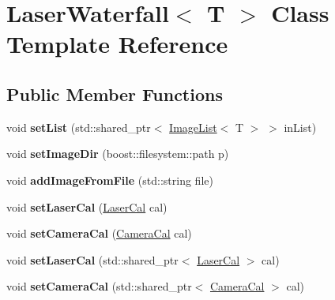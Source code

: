 \hypertarget{classLaserWaterfall}{}\section{Laser\+Waterfall$<$ T $>$ Class Template Reference}
\label{classLaserWaterfall}
\subsection*{Public Member Functions}
\begin{DoxyCompactItemize}
\item 
void {\bfseries set\+List} (std\+::shared\+\_\+ptr$<$ \hyperlink{classImageList}{Image\+List}$<$ T $>$ $>$ in\+List)\hypertarget{classLaserWaterfall_aa47637b350f6a84efc213d2fb3af69f3}{}\label{classLaserWaterfall_aa47637b350f6a84efc213d2fb3af69f3}

\item 
void {\bfseries set\+Image\+Dir} (boost\+::filesystem\+::path p)\hypertarget{classLaserWaterfall_ab7ac5a97ae90d6a007c6d7be0a2bae42}{}\label{classLaserWaterfall_ab7ac5a97ae90d6a007c6d7be0a2bae42}

\item 
void {\bfseries add\+Image\+From\+File} (std\+::string file)\hypertarget{classLaserWaterfall_a5a1223d30238b0f857d437c6871753cb}{}\label{classLaserWaterfall_a5a1223d30238b0f857d437c6871753cb}

\item 
void {\bfseries set\+Laser\+Cal} (\hyperlink{classLaserCal}{Laser\+Cal} cal)\hypertarget{classLaserWaterfall_a5c51b2f9776c279784dd8cd04d3770e7}{}\label{classLaserWaterfall_a5c51b2f9776c279784dd8cd04d3770e7}

\item 
void {\bfseries set\+Camera\+Cal} (\hyperlink{classCameraCal}{Camera\+Cal} cal)\hypertarget{classLaserWaterfall_ac9aa185cf2259b265ffa6679ebf22118}{}\label{classLaserWaterfall_ac9aa185cf2259b265ffa6679ebf22118}

\item 
void {\bfseries set\+Laser\+Cal} (std\+::shared\+\_\+ptr$<$ \hyperlink{classLaserCal}{Laser\+Cal} $>$ cal)\hypertarget{classLaserWaterfall_a8293a170e6f2b9ffe3320802b9d67449}{}\label{classLaserWaterfall_a8293a170e6f2b9ffe3320802b9d67449}

\item 
void {\bfseries set\+Camera\+Cal} (std\+::shared\+\_\+ptr$<$ \hyperlink{classCameraCal}{Camera\+Cal} $>$ cal)\hypertarget{classLaserWaterfall_acd0c34bb7f8d6962c3c97f782536acbc}{}\label{classLaserWaterfall_acd0c34bb7f8d6962c3c97f782536acbc}


\end{DoxyCompactItemize}
